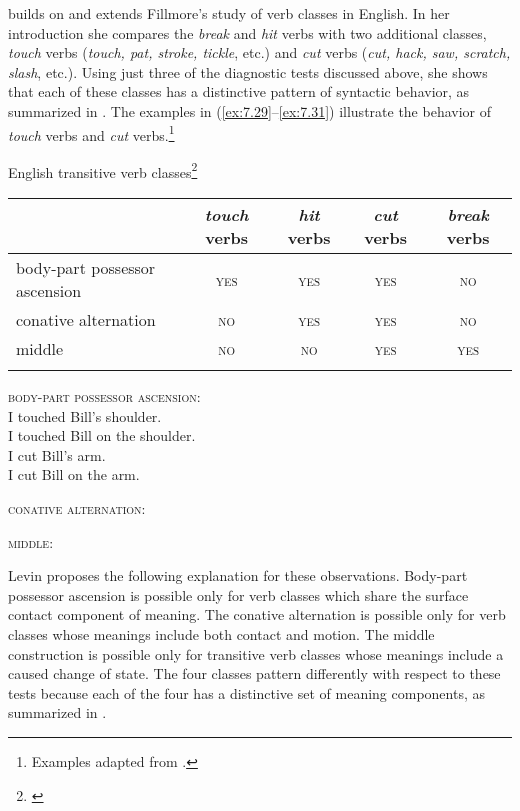 \citet{Levin1993} builds on and extends Fillmore’s study of verb classes in English. In her introduction she compares the \textit{break} and \textit{hit} verbs with two additional classes, \textit{touch} verbs (\textit{touch, pat, stroke, tickle}, etc.) and \textit{cut} verbs (\textit{cut, hack, saw, scratch, slash}, etc.). Using just three of the diagnostic tests discussed above, she shows that each of these classes has a distinctive pattern of syntactic behavior, as summarized in . The examples in (\ref{ex:7.29}--\ref{ex:7.31}) illustrate the behavior of \textit{touch} verbs and \textit{cut} verbs.\footnote{Examples adapted from \citet[6--7]{Levin1993}.}


\ea \label{ex:7.28} English transitive verb classes\footnote{\citet[8]{Levin1993}}\\
\begin{tabularx}{.9\textwidth}{Qcccc} 
\lsptoprule
& \textit{touch} verbs & \textit{hit} verbs & \textit{cut} verbs & \textit{break} verbs\\
\midrule
body-part possessor ascension & \scshape yes & \scshape yes & \scshape yes & \scshape no\\
\tablevspace
conative alternation & \scshape no & \scshape yes & \scshape yes & \scshape no\\
\tablevspace
middle & \scshape no & \scshape no & \scshape yes & \scshape yes\\
\lspbottomrule
\end{tabularx}
\z

\ea \label{ex:7.29}
\textsc{body-part possessor ascension}:\\
\ea  I touched Bill’s shoulder.\\
\ex  I touched Bill on the shoulder.\\
\ex  I cut Bill’s arm.\\
\ex  I cut Bill on the arm.
                       \z
\z

\ea \label{ex:7.39}  \textsc{conative alternation}:\\
                       \z
\z

\ea \label{ex:7.31}
\textsc{middle}:\\
                       \z
\z


Levin proposes the following explanation for these observations. Body-part possessor ascension is possible only for verb classes which share the surface contact component of meaning. The conative alternation is possible only for verb classes whose meanings include both contact and motion. The middle construction is possible only for transitive verb classes whose meanings include a caused change of state. The four classes pattern differently with respect to these tests because each of the four has a distinctive set of meaning components, as summarized in .


